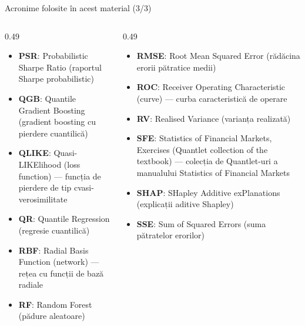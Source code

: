 \begin{frame}{Acronime folosite în acest material (3/3)}
\begin{columns}[T]
\begin{column}{0.49\textwidth}
\begin{itemize}\setlength{\itemsep}{0pt}
    \item \textbf{PSR}: Probabilistic Sharpe Ratio (raportul Sharpe probabilistic)
    \item \textbf{QGB}: Quantile Gradient Boosting (gradient boosting cu pierdere cuantilică)
    \item \textbf{QLIKE}: Quasi-LIKElihood (loss function) — funcția de pierdere de tip cvasi-verosimilitate
    \item \textbf{QR}: Quantile Regression (regresie cuantilică)
    \item \textbf{RBF}: Radial Basis Function (network) — rețea cu funcții de bază radiale
    \item \textbf{RF}: Random Forest (pădure aleatoare)
\end{itemize}
\end{column}
\begin{column}{0.49\textwidth}
\begin{itemize}\setlength{\itemsep}{0pt}
    \item \textbf{RMSE}: Root Mean Squared Error (rădăcina erorii pătratice medii)
    \item \textbf{ROC}: Receiver Operating Characteristic (curve) — curba caracteristică de operare
    \item \textbf{RV}: Realised Variance (varianța realizată)
    \item \textbf{SFE}: Statistics of Financial Markets, Exercises (Quantlet collection of the textbook) — colecția de Quantlet-uri a manualului Statistics of Financial Markets
    \item \textbf{SHAP}: SHapley Additive exPlanations (explicații aditive Shapley)
    \item \textbf{SSE}: Sum of Squared Errors (suma pătratelor erorilor)
\end{itemize}
\end{column}
\end{columns}
\end{frame}

